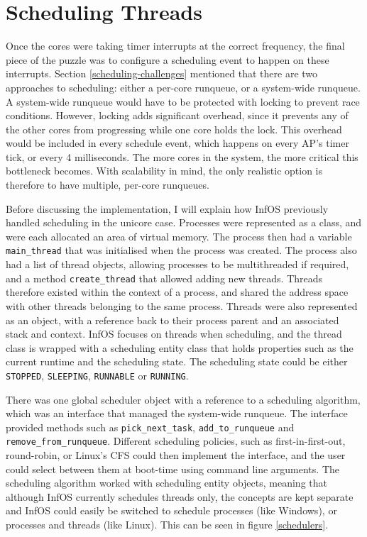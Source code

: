 \documentclass[bsc,frontabs,singlespacing,parskip,deptreport]{infthesis}
\begin{document}
\section{Scheduling Threads} \label{scheduling-threads}
Once the cores were taking timer interrupts at the correct frequency, the final piece of the puzzle was to configure a scheduling event to happen on these interrupts. Section \ref{scheduling-challenges} mentioned that there are two approaches to scheduling: either a per-core runqueue, or a system-wide runqueue. A system-wide runqueue would have to be protected with locking to prevent race conditions. However, locking adds significant overhead, since it prevents any of the other cores from progressing while one core holds the lock. This overhead would be included in every schedule event, which happens on every AP's timer tick, or every 4 milliseconds. The more cores in the system, the more critical this bottleneck becomes. With scalability in mind, the only realistic option is therefore to have multiple, per-core runqueues.

Before discussing the implementation, I will explain how InfOS previously handled scheduling in the unicore case. Processes were represented as a class, and were each allocated an area of virtual memory. The process then had a variable \verb|main_thread| that was initialised when the process was created. The process also had a list of thread objects, allowing processes to be multithreaded if required, and a method \verb|create_thread| that allowed adding new threads. Threads therefore existed within the context of a process, and shared the address space with other threads belonging to the same process. Threads were also represented as an object, with a reference back to their process parent and an associated stack and context. InfOS focuses on threads when scheduling, and the thread class is wrapped with a scheduling entity class that holds properties such as the current runtime and the scheduling state. The scheduling state could be either \verb|STOPPED|, \verb|SLEEPING|, \verb|RUNNABLE| or \verb|RUNNING|.

There was one global scheduler object with a reference to a scheduling algorithm, which was an interface that managed the system-wide runqueue. The interface provided methods such as \texttt{pick\_next\_task}, \texttt{add\_to\_runqueue} and \texttt{remove\_from\_runqueue}. Different scheduling policies, such as first-in-first-out, round-robin, or Linux's CFS could then implement the interface, and the user could select between them at boot-time using command line arguments. The scheduling algorithm worked with scheduling entity objects, meaning that although InfOS currently schedules threads only, the concepts are kept separate and InfOS could easily be switched to schedule processes (like Windows), or processes and threads (like Linux). This can be seen in figure \ref{schedulers}.
\end{document}
